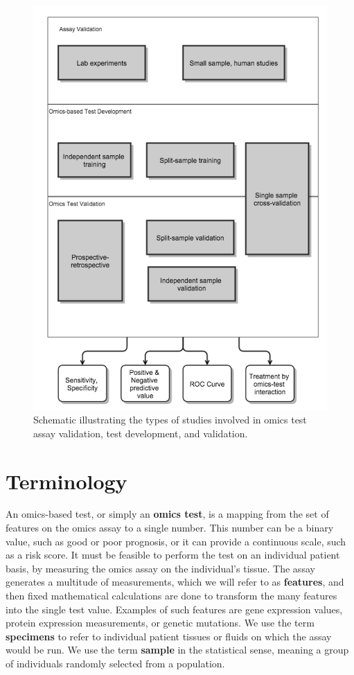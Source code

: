 \documentclass[11pt]{article}
\makeatletter
\def\maxwidth{\ifdim\Gin@nat@width>\linewidth\linewidth
\else\Gin@nat@width\fi}
\let\Oldincludegraphics\includegraphics
\renewcommand{\includegraphics}[1]{\Oldincludegraphics[width=\maxwidth]{#1}}
\makeatother
\begin{document}
\begin{figure}[htbp]
\centering
\includegraphics{figure2-2014-12-16.png}
\caption{Schematic illustrating the types of studies involved in omics
test assay validation, test development, and validation.}
\end{figure}

\section{Terminology}\label{terminology}

An omics-based test, or simply an \textbf{omics test}, is a mapping from
the set of features on the omics assay to a single number. This number
can be a binary value, such as good or poor prognosis, or it can provide
a continuous scale, such as a risk score. It must be feasible to perform
the test on an individual patient basis, by measuring the omics assay on
the individual's tissue. The assay generates a multitude of
measurements, which we will refer to as \textbf{features}, and then
fixed mathematical calculations are done to transform the many features
into the single test value. Examples of such features are gene
expression values, protein expression measurements, or genetic
mutations. We use the term \textbf{specimens} to refer to individual
patient tissues or fluids on which the assay would be run. We use the
term \textbf{sample} in the statistical sense, meaning a group of
individuals randomly selected from a population.
\end{document}
